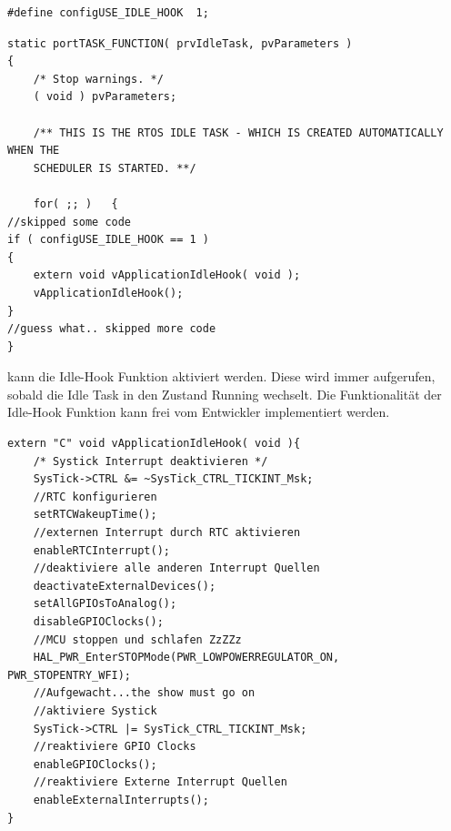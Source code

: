 \begin{lstlisting}[label=lst:defineIdleHook, numbers = none]
#define configUSE_IDLE_HOOK  1; 
\end{lstlisting}
\begin{lstlisting}[caption={Aufruf der IdleTask Hook Funktion durch die FreeRTOS Idle Task. Aus Task.c},captionpos=b, label=lst:xIdleTaskHook, float=htb!]
static portTASK_FUNCTION( prvIdleTask, pvParameters )
{
	/* Stop warnings. */
	( void ) pvParameters;

	/** THIS IS THE RTOS IDLE TASK - WHICH IS CREATED AUTOMATICALLY WHEN THE
	SCHEDULER IS STARTED. **/

	for( ;; )	{
//skipped some code
if ( configUSE_IDLE_HOOK == 1 )
{
	extern void vApplicationIdleHook( void );
	vApplicationIdleHook();
}
//guess what.. skipped more code
}     
\end{lstlisting}
kann die Idle-Hook Funktion aktiviert werden. Diese wird immer aufgerufen, sobald die Idle Task in den Zustand Running wechselt. Die Funktionalität der Idle-Hook Funktion kann frei vom Entwickler implementiert werden. 
\begin{lstlisting}[caption={Pseudocode für eine Idle Hook Funktion},captionpos=b, label=lst:xIdleHookExamp, float=hbt!]
extern "C" void vApplicationIdleHook( void ){
	/* Systick Interrupt deaktivieren */
	SysTick->CTRL &= ~SysTick_CTRL_TICKINT_Msk;
	//RTC konfigurieren
	setRTCWakeupTime();
	//externen Interrupt durch RTC aktivieren
	enableRTCInterrupt();
	//deaktiviere alle anderen Interrupt Quellen
	deactivateExternalDevices();
	setAllGPIOsToAnalog(); 
	disableGPIOClocks();
	//MCU stoppen und schlafen ZzZZz
	HAL_PWR_EnterSTOPMode(PWR_LOWPOWERREGULATOR_ON, PWR_STOPENTRY_WFI); 
	//Aufgewacht...the show must go on
	//aktiviere Systick
	SysTick->CTRL |= SysTick_CTRL_TICKINT_Msk;
	//reaktiviere GPIO Clocks
	enableGPIOClocks();
	//reaktiviere Externe Interrupt Quellen
	enableExternalInterrupts();	
}
\end{lstlisting}
